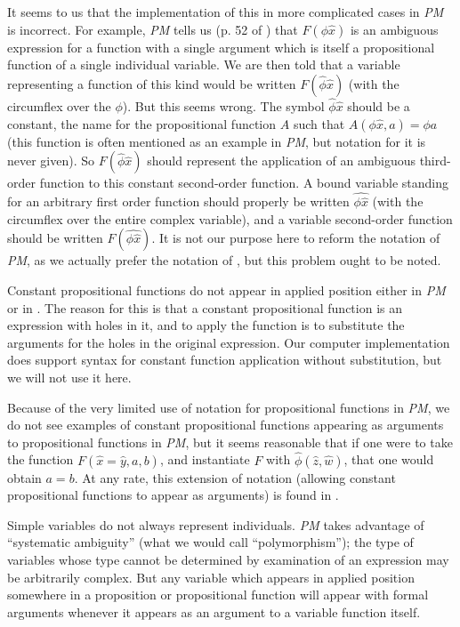 \documentclass{article}
\begin{document}
It seems to us that the implementation of this in more complicated
cases in {\em PM\/} is incorrect.  For example, {\em PM\/} tells us
(p. 52 of \cite{principia}) that $F(\phi \hat{x})$ is an ambiguous expression for a
function with a single argument which is itself a propositional
function of a single individual variable.  We are then told that a
variable representing a function of this kind would be written
$F(\hat{\phi} \hat{x})$ (with the circumflex over the $\phi$).  But
this seems wrong.  The symbol $\hat{\phi} \hat{x}$ should be a
constant, the name for the propositional function $A$ such that
$A(\phi \hat{x},a) = \phi a$ (this function is often mentioned as an
example in {\em PM\/}, but notation for it is never given).  So
$F(\hat{\phi} \hat{x})$ should represent the application of an
ambiguous third-order function to this constant second-order function.
A bound variable standing for an arbitrary first order function should
properly be written $\widehat{\phi \hat{x}}$ (with the circumflex over the
entire complex variable), and a variable second-order function should
be written $F(\widehat{\phi \hat{x}})$.  It is not our purpose here to
reform the notation of {\em PM\/}, as we actually prefer the notation
of \cite{types40}, but this problem ought to be noted.

Constant propositional functions do not appear in applied position
either in {\em PM\/} or in \cite{types40}.  The reason for this is
that a constant propositional function is an expression with holes in
it, and to apply the function is to substitute the arguments for the
holes in the original expression.  Our computer implementation does
support syntax for constant function application without substitution,
but we will not use it here.

Because of the very limited use of notation for propositional
functions in {\em PM\/}, we do not see examples of constant
propositional functions appearing as arguments to propositional
functions in {\em PM\/}, but it seems reasonable that if one were to
take the function $F(\hat{x}=\hat{y},a,b)$, and instantiate $F$ with
$\hat{\phi}(\hat{z},\hat{w})$, that one would obtain $a=b$.  At any
rate, this extension of notation (allowing constant propositional
functions to appear as arguments) is found in \cite{types40}.

Simple variables do not always represent individuals.  {\em PM\/}
takes advantage of ``systematic ambiguity'' (what we would call
``polymorphism''); the type of variables whose type cannot be
determined by examination of an expression may be arbitrarily complex.
But any variable which appears in applied position somewhere in a
proposition or propositional function will appear with formal
arguments whenever it appears as an argument to a variable function
itself.
\end{document}
